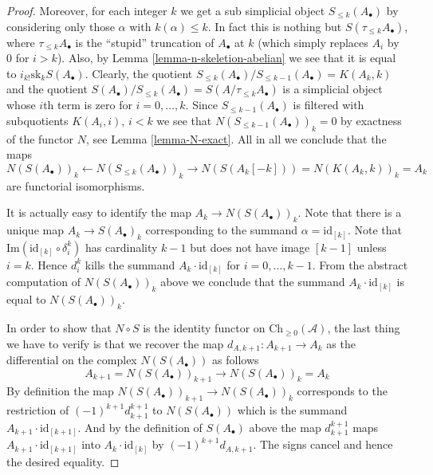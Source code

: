 \begin{proof}
\medskip\noindent
Moreover, for each integer $k$ we get a sub simplicial
object $S_{\leq k}(A_\bullet)$ by considering
only those $\alpha$ with $k(\alpha) \leq k$.
In fact this is nothing but $S(\tau_{\leq k}A_\bullet)$,
where $\tau_{\leq k}A_\bullet$ is the ``stupid'' truncation
of $A_\bullet$ at $k$ (which simply replaces $A_i$ by
$0$ for $i > k$). Also, by Lemma \ref{lemma-n-skeletion-abelian}
we see that it is equal to $i_{k!}\text{sk}_k S(A_\bullet)$.
Clearly, the quotient 
$S_{\leq k}(A_\bullet)/S_{\leq k - 1}(A_\bullet) = K(A_k, k)$
and the quotient
$S(A_\bullet)/S_{\leq k}(A_\bullet) = S(A/\tau_{\leq k}A_\bullet)$
is a simplicial object whose $i$th term is zero for $i = 0, \ldots, k$.
Since $S_{\leq k - 1}(A_\bullet)$ is filtered with
subquotients $K(A_i, i)$, $i < k$ we see that
$N(S_{\leq k - 1}(A_\bullet))_k = 0$ by exactness
of the functor $N$, see Lemma \ref{lemma-N-exact}.
All in all we conclude that the maps
$$
N(S(A_\bullet))_k
\leftarrow
N(S_{\leq k}(A_\bullet))_k
\to
N(S(A_k[-k])) = N(K(A_k, k))_k = A_k
$$
are functorial isomorphisms.

\medskip\noindent
It is actually easy to identify the map $A_k \to N(S(A_\bullet))_k$.
Note that there is a unique map $A_k \to S(A_\bullet)_k$
corresponding to the summand $\alpha = \text{id}_{[k]}$.
Note that $\text{Im}(\text{id}_{[k]} \circ \delta^k_i)$
has cardinality $k - 1$ but does not
have image $[k - 1]$ unless $i = k$. Hence 
$d^k_i$ kills the summand $A_k \cdot \text{id}_{[k]}$
for $i = 0, \ldots, k - 1$. From the abstract computation
of $N(S(A_\bullet))_k$ above we conclude that
the summand $A_k \cdot \text{id}_{[k]}$ is equal to
$N(S(A_\bullet))_k$.

\medskip\noindent
In order to show that $N \circ S$ is the identity
functor on $\text{Ch}_{\geq 0}(\mathcal{A})$,
the last thing we have to verify
is that we recover the map $d_{A, k + 1} : A_{k + 1} \to A_k$
as the differential on the complex $N(S(A_\bullet))$
as follows
$$
A_{k + 1} = N(S(A_\bullet))_{k + 1} \to N(S(A_\bullet))_k = A_k
$$
By definition the map
$N(S(A_\bullet))_{k + 1} \to N(S(A_\bullet))_k$
corresponds to the restriction of $(-1)^{k + 1}d^{k + 1}_{k + 1}$
to $N(S(A_\bullet))$ which is
the summand $A_{k + 1} \cdot \text{id}_{[k + 1]}$.
And by the definition of $S(A_\bullet)$ above the 
map $d^{k + 1}_{k + 1}$ maps $A_{k + 1} \cdot \text{id}_{[k + 1]}$
into $A_k \cdot \text{id}_{[k]}$ by $(-1)^{k + 1}d_{A, k + 1}$.
The signs cancel and hence the desired equality.


\end{proof}

